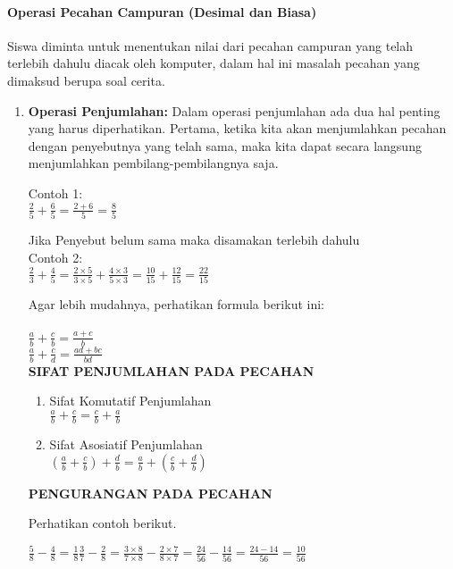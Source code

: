 \paragraph{Operasi Pecahan Campuran (Desimal dan Biasa)}
	Siswa diminta untuk menentukan nilai dari pecahan campuran yang telah terlebih dahulu diacak oleh komputer, dalam hal ini masalah pecahan yang dimaksud berupa soal cerita.
	\par
	\begin{enumerate}	
	\item \textbf{Operasi Penjumlahan:} Dalam operasi penjumlahan ada dua hal penting yang harus diperhatikan. Pertama, ketika kita akan menjumlahkan pecahan dengan penyebutnya yang telah sama, maka kita dapat secara langsung menjumlahkan pembilang-pembilangnya saja.
	
	Contoh 1:\\
	$\frac{2}{5}+\frac{6}{5}=\frac{2+6}{5}=\frac{8}{5}$
	
	Jika Penyebut belum sama maka disamakan terlebih dahulu \\
	Contoh 2:\\
	
	$\frac{2}{3}+\frac{4}{5}=\frac{2\times5}{3\times5}+\frac{4\times3}{5\times3}=\frac{10}{15}+\frac{12}{15}=\frac{22}{15}$
	
	Agar lebih mudahnya, perhatikan formula berikut ini:\\
	\\
	$\frac{a}{b}+\frac{c}{b}=\frac{a+c}{b}$
	\\
	$\frac{a}{b}+\frac{c}{d}=\frac{ad+bc}{bd}$
	\\
	\textbf{SIFAT PENJUMLAHAN PADA PECAHAN}
	\begin{enumerate}
		\item Sifat Komutatif Penjumlahan\\
		$\frac{a}{b}+\frac{c}{b}=\frac{c}{b}+\frac{a}{b}$\\
		\item Sifat Asosiatif Penjumlahan\\
		$\left(\frac{a}{b}+\frac{c}{b}\right)+\frac{d}{b}=\frac{a}{b}+\left(\frac{c}{b}+\frac{d}{b}\right)$
	\end{enumerate}
	
	
	\textbf{PENGURANGAN PADA PECAHAN}
	
	Perhatikan contoh berikut.
	
	$\frac{5}{8}-\frac{4}{8}=\frac{1}{8}
	\frac{3}{7}-\frac{2}{8}=\frac{3\times8}{7\times8}-\frac{2\times7}{8\times7}=\frac{24}{56}-\frac{14}{56}=\frac{24-14}{56}=\frac{10}{56}$
	

\end{enumerate}
